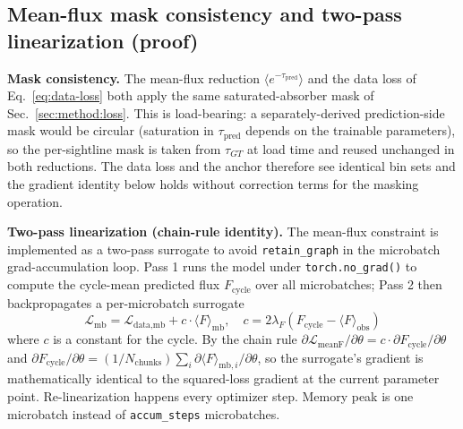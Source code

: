 \subsection{Mean-flux mask consistency and two-pass linearization (proof)}
\label{sec:suppl:method:twopass}
\textbf{Mask consistency.} The mean-flux reduction $\langle e^{-\tau_{\text{pred}}}\rangle$ and the data loss of Eq.~\ref{eq:data-loss} both apply the same saturated-absorber mask of Sec.~\ref{sec:method:loss}. This is load-bearing: a separately-derived prediction-side mask would be circular (saturation in $\tau_{\text{pred}}$ depends on the trainable parameters), so the per-sightline mask is taken from $\tau_{GT}$ at load time and reused unchanged in both reductions. The data loss and the anchor therefore see identical bin sets and the gradient identity below holds without correction terms for the masking operation.

\textbf{Two-pass linearization (chain-rule identity).} The mean-flux constraint is implemented as a two-pass surrogate to avoid \texttt{retain\_graph} in the microbatch grad-accumulation loop. Pass 1 runs the model under \texttt{torch.no\_grad()} to compute the cycle-mean predicted flux $F_{\text{cycle}}$ over all microbatches; Pass 2 then backpropagates a per-microbatch surrogate
\begin{equation*}
\mathcal{L}_{\text{mb}} = \mathcal{L}_{\text{data,mb}} + c \cdot \langle F\rangle_{\text{mb}}, \quad c = 2 \lambda_F (F_{\text{cycle}} - \langle F\rangle_{\text{obs}})
\end{equation*}
where $c$ is a constant for the cycle. By the chain rule $\partial \mathcal{L}_{\text{meanF}}/\partial \theta = c \cdot \partial F_{\text{cycle}}/\partial \theta$ and $\partial F_{\text{cycle}}/\partial \theta = (1/N_{\text{chunks}}) \sum_i \partial \langle F\rangle_{\text{mb},i}/\partial \theta$, so the surrogate's gradient is mathematically identical to the squared-loss gradient at the current parameter point. Re-linearization happens every optimizer step. Memory peak is one microbatch instead of \texttt{accum\_steps} microbatches.

